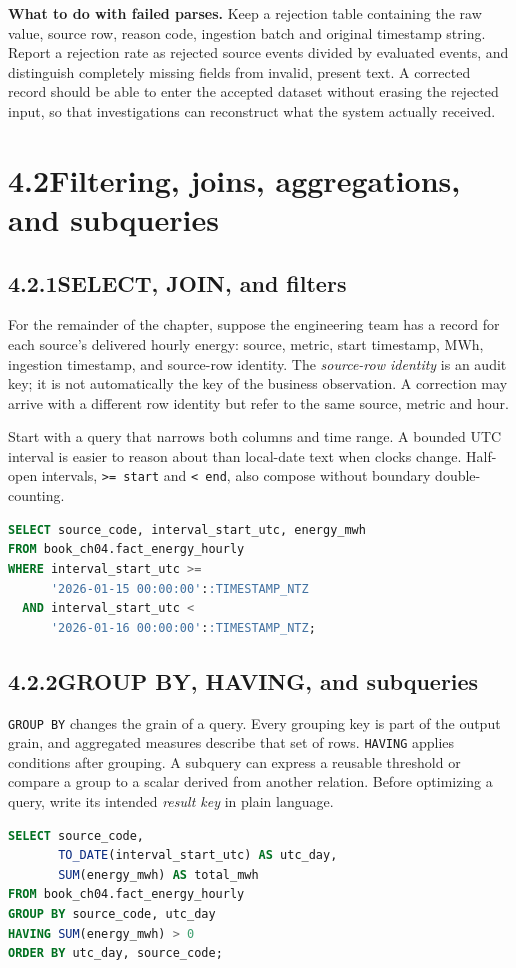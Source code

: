 \documentclass[11pt,twoside]{article}
\newcommand{\topic}[2]{\subsection*{#1\quad #2}}
\begin{document}
\textbf{What to do with failed parses.} Keep a rejection table containing the raw value, source row, reason code, ingestion batch and original timestamp string. Report a rejection rate as rejected source events divided by evaluated events, and distinguish completely missing fields from invalid, present text. A corrected record should be able to enter the accepted dataset without erasing the rejected input, so that investigations can reconstruct what the system actually received.

\newpage
\section*{4.2\quad Filtering, joins, aggregations, and subqueries}
\topic{4.2.1}{SELECT, JOIN, and filters}
For the remainder of the chapter, suppose the engineering team has a record for each source's delivered hourly energy: source, metric, start timestamp, MWh, ingestion timestamp, and source-row identity. The \emph{source-row identity} is an audit key; it is not automatically the key of the business observation. A correction may arrive with a different row identity but refer to the same source, metric and hour.

Start with a query that narrows both columns and time range. A bounded UTC interval is easier to reason about than local-date text when clocks change. Half-open intervals, \texttt{>= start} and \texttt{< end}, also compose without boundary double-counting.
\begin{lstlisting}[language=SQL,caption={Bounded fact query: no implicit all-time scan.}]
SELECT source_code, interval_start_utc, energy_mwh
FROM book_ch04.fact_energy_hourly
WHERE interval_start_utc >=
      '2026-01-15 00:00:00'::TIMESTAMP_NTZ
  AND interval_start_utc <
      '2026-01-16 00:00:00'::TIMESTAMP_NTZ;
\end{lstlisting}

\topic{4.2.2}{GROUP BY, HAVING, and subqueries}
\texttt{GROUP BY} changes the grain of a query. Every grouping key is part of the output grain, and aggregated measures describe that set of rows. \texttt{HAVING} applies conditions after grouping. A subquery can express a reusable threshold or compare a group to a scalar derived from another relation. Before optimizing a query, write its intended \emph{result key} in plain language.
\begin{lstlisting}[language=SQL,caption={Daily energy by source, after quality filtering.}]
SELECT source_code,
       TO_DATE(interval_start_utc) AS utc_day,
       SUM(energy_mwh) AS total_mwh
FROM book_ch04.fact_energy_hourly
GROUP BY source_code, utc_day
HAVING SUM(energy_mwh) > 0
ORDER BY utc_day, source_code;
\end{lstlisting}
\end{document}
